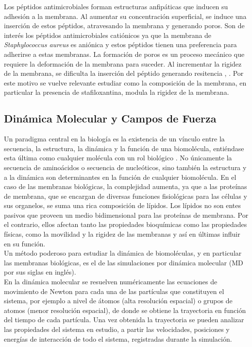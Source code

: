 \documentclass[12pt]{article}
\begin{document}
Los péptidos antimicrobiales forman estructuras anfipáticas que inducen su adhesión a la membrana. Al aumentar su concentración superficial, se induce una inserción de estos péptidos, atravesando la membrana y generando poros. Son de interés los péptidos antimicrobiales catiónicos ya que la membrana de \textit{Staphylococcus aureus} es aniónica y estos péptidos tienen una preferencia para adherirse a estas membranas. La formación de poros es un proceso mecánico que requiere la deformación de la membrana para suceder. Al incrementar la rigidez de la membrana, se dificulta la inserción del péptido generando resitencia \cite{Perez-LopezVariationsProperties}, \cite{Nagendra2011}. Por este motivo se vuelve relevante estudiar como la composición de la membrana, en particular la presencia de stafiloxantina, modula la rigidez de la membrana.
\subsection{Dinámica Molecular y Campos de Fuerza}\label{ss:md} 
Un paradigma central en la biología es la existencia de un vínculo entre la secuencia, la estructura, la dinámica y la función de una biomolécula, entiéndase esta última como cualquier molécula con un rol biológico \cite{Cui2006}. No únicamente la secuencia de aminoácidos o secuencia de nucleóticos, sino también la estructura y a la dinámica son determinantes en la función de cualquier biomolécula. En el caso de las membranas biológicas, la complejidad aumenta, ya que a las proteínas de membrana, que se encargan de diversas funciones fisiológicas para las células y sus organelos, se suma una rica composición de lípidos. Los lípidos no son entes pasivos que proveen un medio bidimensional para las proteínas de membrana. Por el contrario, ellos afectan tanto las propiedades bioquímicas como las propiedades físicas, como la movilidad y la rigidez de las membranas y así en últimas influir en su función.\\

Un método poderoso para estudiar la dinámica de biomoléculas, y en particular las membranas biológicas, es el de las simulaciones por dinámica molecular (MD por sus siglas en inglés).\\

En la dinámica molecular se resuelven numéricamente las ecuaciones de movimiento de Newton para cada una de las partículas que constituyen el sistema, por ejemplo a nivel de átomos (alta resolución espacial) o grupos de atomos (menor resolución espacial), de donde se obtiene la trayectoria en función del tiempo de cada partícula. Una vez obtenida la trayectoria se pueden analizar las propiedades del sistema en estudio, a partir las velocidades, posiciones y energías de interacción de todo el sistema, registradas durante la simulación.\\
\end{document}
